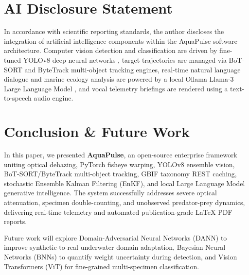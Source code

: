 \documentclass[11pt,a4paper]{article}
\newcommand{\citeblue}[1]{{\color{linkblue}\cite{#1}}}
\begin{document}
\section{AI Disclosure Statement}
In accordance with scientific reporting standards, the author discloses the integration of artificial intelligence components within the AquaPulse software architecture. Computer vision detection and classification are driven by fine-tuned YOLOv8 deep neural networks \citeblue{jocher2023ultralytics}, target trajectories are managed via BoT-SORT \citeblue{aharon2022botsort} and ByteTrack \citeblue{zhang2022bytetrack} multi-object tracking engines, real-time natural language dialogue and marine ecology analysis are powered by a local Ollama Llama-3 Large Language Model \citeblue{touvron2023llama, dubey2024llama3}, and vocal telemetry briefings are rendered using a text-to-speech audio engine.

\section{Conclusion \& Future Work}
In this paper, we presented \textbf{AquaPulse}, an open-source enterprise framework uniting optical dehazing, PyTorch fisheye warping, YOLOv8 ensemble vision, BoT-SORT/ByteTrack multi-object tracking, GBIF taxonomy REST caching, stochastic Ensemble Kalman Filtering (EnKF), and local Large Language Model generative intelligence. The system successfully addresses severe optical attenuation, specimen double-counting, and unobserved predator-prey dynamics, delivering real-time telemetry and automated publication-grade LaTeX PDF reports.

Future work will explore Domain-Adversarial Neural Networks (DANN) \citeblue{ganin2016domain} to improve synthetic-to-real underwater domain adaptation, Bayesian Neural Networks (BNNs) \citeblue{blundell2015weight} to quantify weight uncertainty during detection, and Vision Transformers (ViT) \citeblue{dosovitskiy2020image} for fine-grained multi-specimen classification.
\end{document}
